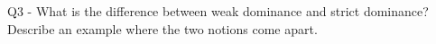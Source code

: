 \documentclass[
  12pt,
  letterpaper,
  DIV=11,
  numbers=noendperiod]{scrartcl}
\begin{document}
\vspace{0.3cm} \dotfill

\vspace{0.3cm} \dotfill

\vspace{0.3cm} \dotfill

\vspace{0.3cm} \dotfill

\vspace{0.3cm} \dotfill

\vspace{0.3cm} \dotfill

\vspace{0.3cm} \dotfill

\vspace{0.3cm} \dotfill

\vspace{0.3cm} \dotfill

\vspace{0.3cm} \dotfill

\vspace{0.3cm} \dotfill

\vspace{0.3cm} \dotfill

\vspace{0.3cm} \dotfill

\vspace{0.3cm} \dotfill

\vspace{0.3cm} \dotfill

\vspace{0.3cm} \dotfill

\vspace{0.3cm} \dotfill

\newpage

Q3 - What is the difference between weak dominance and strict dominance?
Describe an example where the two notions come apart.

\vspace{0.3cm} \dotfill

\vspace{0.3cm} \dotfill

\vspace{0.3cm} \dotfill

\vspace{0.3cm} \dotfill

\vspace{0.3cm} \dotfill

\vspace{0.3cm} \dotfill
\end{document}
